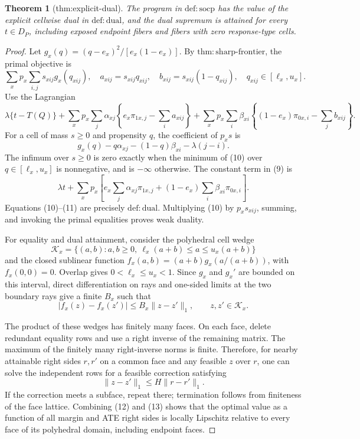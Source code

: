 \documentclass{article}
\newtheorem{theorem}{Theorem}
\begin{document}
\begin{theorem}[thm:explicit-dual]\label{thm:explicit-dual}
The program in \(\mathrm{def{:}socp}\) has the value of the explicit cellwise dual in \(\mathrm{def{:}dual}\), and the dual supremum is attained for every \(t\in D_P\), including exposed endpoint fibers and fibers with zero response-type cells.
\end{theorem}
\begin{proof}
Let \(g_x(q)=(q-e_x)^2/[e_x(1-e_x)]\). By \(\mathrm{thm{:}sharp\mbox{-}frontier}\), the primal objective is
\[
\sum_xp_x\sum_{i,j}s_{xij}g_x(q_{xij}),\quad
a_{xij}=s_{xij}q_{xij},\quad b_{xij}=s_{xij}(1-q_{xij}),\quad
q_{xij}\in[\ell_x,u_x]. \tag{8}
\]
Use the Lagrangian
\[
\lambda\{t-T(Q)\}
+\sum_xp_x\sum_j\alpha_{xj}\left\{e_x\pi_{1x,j}-\sum_i a_{xij}\right\}
+\sum_xp_x\sum_i\beta_{xi}\left\{(1-e_x)\pi_{0x,i}-\sum_j b_{xij}\right\}. \tag{9}
\]
For a cell of mass \(s\geq0\) and propensity \(q\), the coefficient of \(p_xs\) is
\[
g_x(q)-q\alpha_{xj}-(1-q)\beta_{xi}-\lambda(j-i). \tag{10}
\]
The infimum over \(s\geq0\) is zero exactly when the minimum of (10) over \(q\in[\ell_x,u_x]\) is nonnegative, and is \(-\infty\) otherwise. The constant term in (9) is
\[
\lambda t+\sum_xp_x\left[e_x\sum_j\alpha_{xj}\pi_{1x,j}
+(1-e_x)\sum_i\beta_{xi}\pi_{0x,i}\right]. \tag{11}
\]
Equations (10)--(11) are precisely \(\mathrm{def{:}dual}\). Multiplying (10) by \(p_xs_{xij}\), summing, and invoking the primal equalities proves weak duality.

For equality and dual attainment, consider the polyhedral cell wedge
\[
\mathcal K_x=\{(a,b):a,b\geq0,\ \ell_x(a+b)\leq a\leq u_x(a+b)\}
\]
and the closed sublinear function \(f_x(a,b)=(a+b)g_x(a/(a+b))\), with \(f_x(0,0)=0\). Overlap gives \(0<\ell_x\leq u_x<1\). Since \(g_x\) and \(g_x'\) are bounded on this interval, direct differentiation on rays and one-sided limits at the two boundary rays give a finite \(B_x\) such that
\[
|f_x(z)-f_x(z')|\leq B_x\|z-z'\|_1,\qquad z,z'\in\mathcal K_x. \tag{12}
\]

The product of these wedges has finitely many faces. On each face, delete redundant equality rows and use a right inverse of the remaining matrix. The maximum of the finitely many right-inverse norms is finite. Therefore, for nearby attainable right sides \(r,r'\) on a common face and any feasible \(z\) over \(r\), one can solve the independent rows for a feasible correction satisfying
\[
\|z-z'\|_1\leq H\|r-r'\|_1. \tag{13}
\]
If the correction meets a subface, repeat there; termination follows from finiteness of the face lattice. Combining (12) and (13) shows that the optimal value as a function of all margin and ATE right sides is locally Lipschitz relative to every face of its polyhedral domain, including endpoint faces.


\end{proof}
\end{document}
